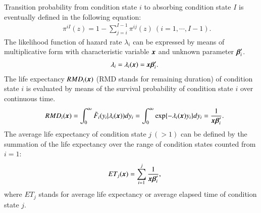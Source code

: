 \documentclass[a4paper,oneside,onecolumn,preprint,10pt,authoryear]{elsarticle}
\begin{document}
Transition probability from condition state $i$ to absorbing condition state $I$ is eventually defined in the following equation:
\begin{eqnarray}
&& \pi^{iI}(z)=1-\sum_{j=i}^{I-1}\pi^{ij}(z)~(i=1,\cdots,I-1).\label{oil}
\end{eqnarray}
The likelihood function of hazard rate $\lambda_i$ can be expressed by means of multiplicative form with  characteristic variable $\mbox{\boldmath$x$}$ and unknown parameter $\mbox{\boldmath$\beta$}_i^\prime$.
\begin{eqnarray}
&& \lambda_i=\lambda_i(\mbox{\boldmath$x$}) =\mbox{\boldmath$x$}\mbox{\boldmath$\beta$}_i^\prime. \label{hazard11}
\end{eqnarray}
The life expectancy $RMD_i(\mbox{\boldmath$x$})$ (RMD stands for remaining duration) of condition state $i$ is evaluated by means of the survival probability of condition state $i$ over continuous time.
\begin{eqnarray}
&& RMD_i(\mbox{\boldmath$x$})= \int^{\infty}_{0}\tilde{F}_i(y_i|\lambda_i(\mbox{\boldmath$x$}))dy_i  = \int^{\infty}_{0}\exp \{-\lambda_i(\mbox{\boldmath$x$})y_i\}dy_i=\frac{1}{\mbox{\boldmath$x$}\mbox{\boldmath$\beta$}_i^\prime}.\label{kenzen}
\end{eqnarray}
The average life expectancy of condition state $j~(>1)$ can be defined by the summation of the life expectancy over the range of condition states counted from $i=1$:
\begin{eqnarray}
&& ET_j(\mbox{\boldmath$x$})=\sum_{i=1}^j \frac{1}{\mbox{\boldmath$x$}\mbox{\boldmath$\beta$}_i^\prime}, \label{hy}
\end{eqnarray}
where $ET_j$ stands for average life expectancy or average elapsed time of condition state $j$.







 

\end{document}

